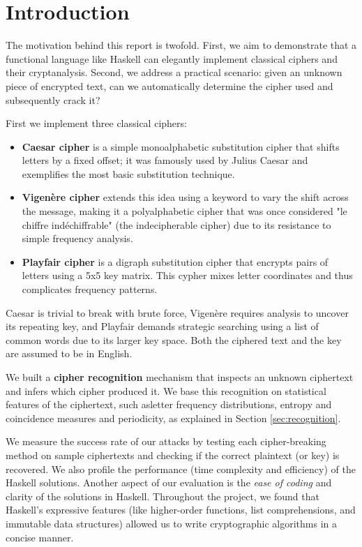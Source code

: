 
\section{Introduction}

The motivation behind this report is twofold. First, we aim to demonstrate that a functional language like Haskell can elegantly implement classical ciphers and their cryptanalysis. Second, we address a practical scenario: given an unknown piece of encrypted text, can we automatically determine the cipher used and subsequently crack it? 

First we implement three classical ciphers:

\begin{itemize}
    \item \textbf{Caesar cipher} is a simple monoalphabetic substitution cipher that shifts letters by a fixed offset; it was famously used by Julius Caesar and exemplifies the most basic substitution technique. 

    \item \textbf{Vigen\`ere cipher} extends this idea using a keyword to vary the shift across the message, making it a polyalphabetic cipher that was once considered "le chiffre ind\'echiffrable" (the indecipherable cipher) due to its resistance to simple frequency analysis.

    \item \textbf{Playfair cipher} is a digraph substitution cipher that encrypts pairs of letters using a 5x5 key matrix. This cypher mixes letter coordinates and thus complicates frequency patterns. \cite{banoth2023}
\end{itemize}

Caesar is trivial to break with brute force, Vigen\`ere requires analysis to uncover its repeating key, and Playfair demands strategic searching using a list of common words due to its larger key space. Both the ciphered text and the key are assumed to be in English.

We built a \textbf{cipher recognition} mechanism that inspects an unknown ciphertext and infers which cipher produced it. We base this recognition on statistical features of the ciphertext, such asletter frequency distributions, entropy and coincidence measures and periodicity, as explained in Section \ref{sec:recognition}.

We measure the success rate of our attacks by testing each cipher-breaking method on sample ciphertexts and checking if the correct plaintext (or key) is recovered. We also profile the performance (time complexity and efficiency) of the Haskell solutions. Another aspect of our evaluation is the \textit{ease of coding} and clarity of the solutions in Haskell. Throughout the project, we found that Haskell’s expressive features (like higher-order functions, list comprehensions, and immutable data structures) allowed us to write cryptographic algorithms in a concise manner.